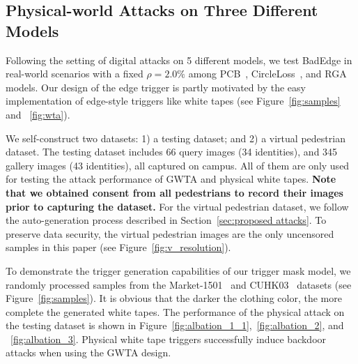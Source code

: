 \documentclass[sigconf,authordraft]{acmart}
\begin{document}

\subsection{Physical-world Attacks on Three Different Models}\label{sec:A2}
Following the setting of digital attacks on 5 different models, we test BadEdge in real-world scenarios with a fixed $\rho = 2.0\%$ among PCB~\cite{sun2018beyond}, CircleLoss~\cite{sun2020circle}, and RGA~\cite{zhang2020relation} models. Our design of the edge trigger is partly motivated by the easy implementation of edge-style triggers like white tapes (see Figure~\ref{fig:samples} and ~\ref{fig:wta}). 

We self-construct two datasets: 1) a testing dataset; and 2) a virtual pedestrian dataset.
The testing dataset includes 66 query images (34 identities), and 345 gallery images (43 identities), all captured on campus. All of them are only used for testing the attack performance of GWTA and physical white tapes. \textbf{Note that we obtained consent from all pedestrians to record their images prior to capturing the dataset.}
For the virtual pedestrian dataset, we follow the auto-generation process described in Section~\ref{sec:proposed attacks}. To preserve data security, the virtual pedestrian images are the only uncensored samples in this paper (see Figure~\ref{fig:v_resolution}).

To demonstrate the trigger generation capabilities of our trigger mask model, we randomly processed samples from the Market-1501~\cite{zhang2017alignedreid} and CUHK03~\cite{li2014deepreid} datasets (see Figure~\ref{fig:samples}). 
% 
It is obvious that the darker the clothing color, the more complete the generated white tapes.
The performance of the physical attack on the testing dataset is shown in Figure~\ref{fig:albation_1_1},~\ref{fig:albation_2}, and ~\ref{fig:albation_3}. Physical white tape triggers successfully induce backdoor attacks when using the GWTA design.












\end{document}
